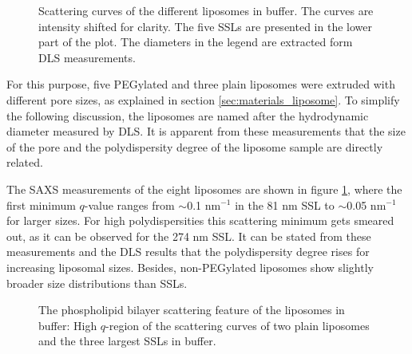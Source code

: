 \begin{figure}
	\centering
		
		\caption[Scattering curves of the liposomes in buffer.]{Scattering curves of the different liposomes in buffer. The curves are intensity shifted for clarity. The five SSLs are presented in the lower part of the plot. The diameters in the legend are extracted form DLS measurements.}
		\label{fig:SSLSingleContrast}
\end{figure}



For this purpose, five PEGylated and three plain liposomes were extruded with different pore sizes, as explained in section \ref{sec:materials_liposome}. To simplify the following discussion, the liposomes are named after the hydrodynamic diameter measured by DLS. It is apparent from these measurements that the size of the pore and the polydispersity degree of the liposome sample are directly related.

The SAXS measurements of the eight liposomes are shown in figure \ref{fig:SSLSingleContrast}, where the first minimum  $q$-value ranges from $\sim$0.1 nm$^{-1}$ in the 81 nm SSL to $\sim$0.05 nm$^{-1}$ for larger sizes. For high polydispersities this scattering minimum gets smeared out, as it can be observed for the 274 nm SSL. It can be stated from these measurements and the DLS results that the polydispersity degree rises for increasing liposomal sizes. Besides, non-PEGylated liposomes show slightly broader size distributions than SSLs.

\begin{figure}
	\centering
		
		\caption[The phospholipid bilayer scattering feature of the liposomes in buffer.]{The phospholipid bilayer scattering feature of the liposomes in buffer: High $q$-region of the scattering curves of two plain liposomes and the three largest SSLs in buffer.}
		\label{fig:SSLSingleContrastBilayer}
\end{figure}

